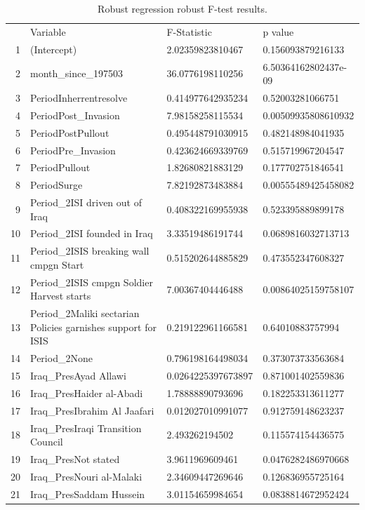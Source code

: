 \begin{table}[ht]
  \label{tab:robustregFtest}
\begin{adjustbox}{width=1\textwidth}
\small    
\centering
\begin{tabular}{rlll}
  \hline
 & Variable & F-Statistic & p value \\ 
  
1 & (Intercept) & 2.02359823810467 & 0.156093879216133 \\ 
  2 & month\_since\_197503 & 36.0776198110256 & 6.50364162802437e-09 \\ 
  3 & PeriodInherrentresolve & 0.414977642935234 & 0.52003281066751 \\ 
  4 & PeriodPost\_Invasion & 7.98158258115534 & 0.00509935808610932 \\ 
  5 & PeriodPostPullout & 0.495448791030915 & 0.482148984041935 \\ 
  6 & PeriodPre\_Invasion & 0.423624669339769 & 0.515719967204547 \\ 
  7 & PeriodPullout & 1.82680821883129 & 0.177702751846541 \\ 
  8 & PeriodSurge & 7.82192873483884 & 0.00555489425458082 \\ 
  9 & Period\_2ISI driven out of Iraq & 0.408322169955938 & 0.523395889899178 \\ 
  10 & Period\_2ISI founded in Iraq & 3.33519486191744 & 0.0689816032713713 \\ 
  11 & Period\_2ISIS breaking wall cmpgn Start & 0.515202644885829 & 0.473552347608327 \\ 
  12 & Period\_2ISIS cmpgn Soldier Harvest starts & 7.00367404446488 & 0.00864025159758107 \\ 
  13 & Period\_2Maliki sectarian Policies garnishes support for ISIS & 0.219122961166581 & 0.64010883757994 \\ 
  14 & Period\_2None & 0.796198164498034 & 0.373073733563684 \\ 
  15 & Iraq\_PresAyad Allawi & 0.0264225397673897 & 0.871001402559836 \\ 
  16 & Iraq\_PresHaider al-Abadi & 1.78888890793696 & 0.182253313611277 \\ 
  17 & Iraq\_PresIbrahim Al Jaafari & 0.012027010991077 & 0.912759148623237 \\ 
  18 & Iraq\_PresIraqi Transition Council & 2.493262194502 & 0.115574154436575 \\ 
  19 & Iraq\_PresNot stated & 3.9611969609461 & 0.0476282486970668 \\ 
  20 & Iraq\_PresNouri al-Malaki & 2.34609447269646 & 0.126836955725164 \\ 
  21 & Iraq\_PresSaddam Hussein & 3.01154659984654 & 0.0838814672952424 \\ 
   \hline
\end{tabular}
\end{adjustbox}
\caption{Robust regression robust F-test results.}
\end{table}

